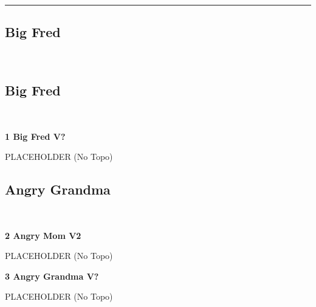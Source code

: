 \rule{\textwidth}{1pt}
\begin{multicols}{2}
		\section{Big Fred}\label{sa:Big Fred}
	\begin{minipage}{\columnwidth}
	\
	\end{minipage}
			\subsection*{Big Fred}\label{bf:Big Fred}
			\begin{minipage}{\columnwidth}
			\
			\end{minipage}
			
					\begin{minipage}{\linewidth}	
					\label{rt:Big Fred}\colorbox{black!20}{\textbf{1 Big Fred V?  }}
					\begin{adjustwidth}{0.5cm}{}				
					PLACEHOLDER
						\newline (No Topo) 
					\end{adjustwidth}
					\end{minipage}
			\subsection*{Angry Grandma}\label{bf:Angry Grandma}
			\begin{minipage}{\columnwidth}
			\
			\end{minipage}
			
					\begin{minipage}{\linewidth}	
					\label{rt:Angry Mom}\colorbox{green!20}{\textbf{2 Angry Mom V2  }}
					\begin{adjustwidth}{0.5cm}{}				
					PLACEHOLDER
						\newline (No Topo) 
					\end{adjustwidth}
					\end{minipage}
					\begin{minipage}{\linewidth}	
					\label{rt:Angry Grandma}\colorbox{black!20}{\textbf{3 Angry Grandma V?  }}
					\begin{adjustwidth}{0.5cm}{}				
					PLACEHOLDER
						\newline (No Topo) 
					\end{adjustwidth}
					\end{minipage}
\end{multicols}
\clearpage